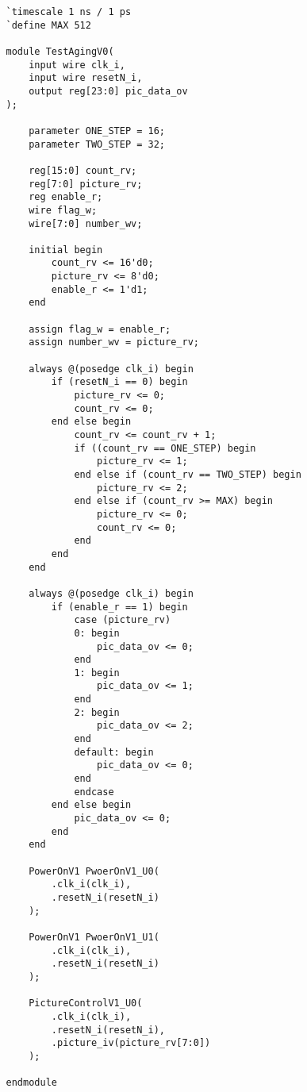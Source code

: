\documentclass[utf-8, 10pt, a4paper, titlepage, oneside, onecolumn, openany]{ctexart} %
\begin{document}
		\begin{shaded}
			\begin{verbatim}
				`timescale 1 ns / 1 ps
				`define MAX 512
				
				module TestAgingV0(
					input wire clk_i,
					input wire resetN_i,
					output reg[23:0] pic_data_ov
				);
				
					parameter ONE_STEP = 16;
					parameter TWO_STEP = 32;

					reg[15:0] count_rv;
					reg[7:0] picture_rv;
					reg enable_r;
					wire flag_w;
					wire[7:0] number_wv;
					
					initial begin
						count_rv <= 16'd0;
						picture_rv <= 8'd0;
						enable_r <= 1'd1;
					end
					
					assign flag_w = enable_r;
					assign number_wv = picture_rv;
					
					always @(posedge clk_i) begin
						if (resetN_i == 0) begin
							picture_rv <= 0;
							count_rv <= 0;
						end else begin
							count_rv <= count_rv + 1;
							if ((count_rv == ONE_STEP) begin
								picture_rv <= 1;
							end else if (count_rv == TWO_STEP) begin
								picture_rv <= 2;
							end else if (count_rv >= MAX) begin
								picture_rv <= 0;
								count_rv <= 0;
							end
						end
					end

					always @(posedge clk_i) begin
						if (enable_r == 1) begin
							case (picture_rv)
							0: begin
								pic_data_ov <= 0;
							end
							1: begin
								pic_data_ov <= 1;
							end
							2: begin
								pic_data_ov <= 2;
							end
							default: begin
								pic_data_ov <= 0;
							end
							endcase
						end else begin
							pic_data_ov <= 0;
						end
					end
					
					PowerOnV1 PwoerOnV1_U0(
						.clk_i(clk_i),
						.resetN_i(resetN_i)
					);
					
					PowerOnV1 PwoerOnV1_U1(
						.clk_i(clk_i),
						.resetN_i(resetN_i)
					);
					
					PictureControlV1_U0(
						.clk_i(clk_i),
						.resetN_i(resetN_i),
						.picture_iv(picture_rv[7:0])
					);
					
				endmodule

			\end{verbatim}
		\end{shaded}

	\clearpage
\end{document}
